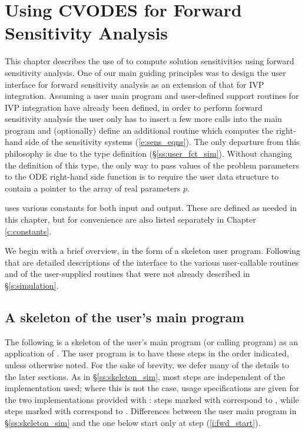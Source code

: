 \chapter{Using CVODES for Forward Sensitivity Analysis}\label{s:forward}

This chapter describes the use of {\cvodes} to compute solution sensitivities using
forward sensitivity analysis. One of our main guiding principles was to design 
the {\cvodes} user interface for forward sensitivity analysis as an extension of
that for IVP integration. Assuming a user main program and user-defined support 
routines for IVP integration have already been defined, in order to perform 
forward sensitivity analysis the user only has to insert a few more calls 
into the main program and (optionally) define an additional routine which
computes the right-hand side of the sensitivity systems (\ref{e:sens_eqns}). 
The only departure from this philosophy is due to the  type definition
(\S\ref{ss:user_fct_sim}). Without changing the definition of this type, the
only way to pass values of the problem parameters to the ODE right-hand side
function is to require the user data structure  to contain a pointer
to the array of real parameters $p$.

{\cvodes} uses various constants for both input and output.  These are
defined as needed in this chapter, but for convenience are also listed
separately in Chapter \ref{c:constants}.

We begin with a brief overview, in the form of a skeleton user program.
Following that are detailed descriptions of the interface to the
various user-callable routines and of the user-supplied routines that were not already
described in \S\ref{s:simulation}.

\section{A skeleton of the user's main program}\label{s:forward_usage}

The following is a skeleton of the user's main program (or calling
program) as an application of {\cvodes}. The user program is to have these 
steps in the order indicated, unless otherwise noted.
For the sake of brevity, we defer many of the details to the later sections.
As in \S\ref{ss:skeleton_sim}, most steps are independent of the {\nvector}
implementation used; where this is not the case, usage specifications are given for the
two implementations provided with {\cvodes}: steps marked with {\p} correspond to 
{\nvecp}, while steps marked with {\s} correspond to {\nvecs}.
Differences between the user main program in \S\ref{ss:skeleton_sim} and
the one below start only at step (\ref{i:fwd_start}).

